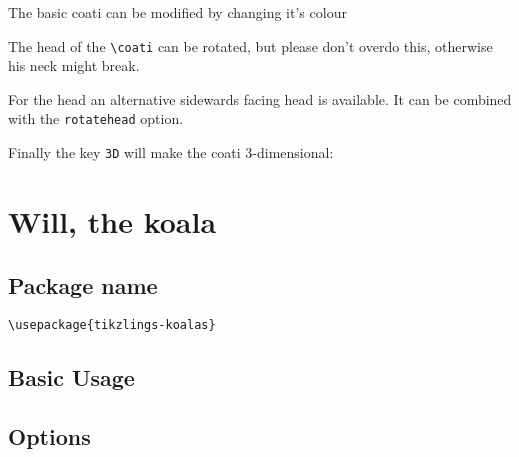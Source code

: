 \documentclass[parskip=half]{scrartcl}
\begin{document}
The basic coati can be modified by changing it's colour

\begin{tcblisting}{}
\coati[body=SteelBlue]
\end{tcblisting}

The head of the \lstinline|\coati| can be rotated, but please don't overdo this, otherwise his neck might break.

\begin{tcblisting}{}
\coati[rotatehead=-15]
\end{tcblisting}

For the head an alternative sidewards facing head is available. It can be combined with the \lstinline|rotatehead| option.

\begin{tcblisting}{}
\coati[sideward]
\end{tcblisting}

Finally the key \lstinline|3D| will make the coati 3-dimensional:

\begin{tcblisting}{}
\coati[3D]
\end{tcblisting}


\clearpage
\section[\textbackslash koala]{Will, the koala}

\subsection{Package name}

\begin{tcolorbox}[lower separated=false, lefthand width=.8\linewidth]
\vspace*{0.5cm}
\lstinline|\usepackage{tikzlings-koalas}|
\vspace*{0.5cm}
\end{tcolorbox}

\subsection{Basic Usage}

\begin{tcblisting}{}
\koala
\end{tcblisting}

\subsection{Options}
\end{document}
